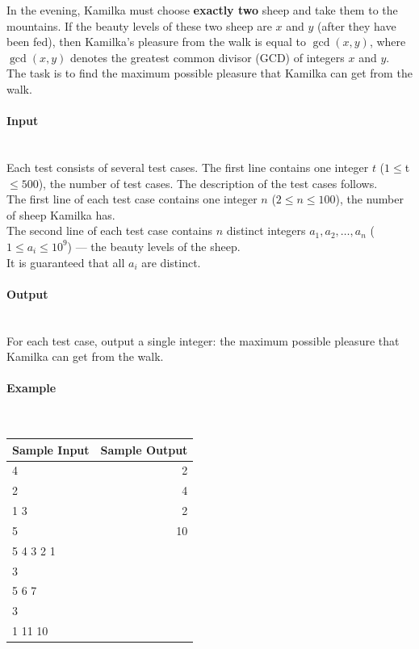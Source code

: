 \documentclass{article}
\begin{document}
In the evening, Kamilka must choose \textbf{exactly two} sheep and take them to the mountains. If the beauty levels of these two sheep are $x$ and $y$ (after they have been fed), then Kamilka's pleasure from the walk is equal to $\gcd(x, y)$, where $\gcd(x, y)$ denotes the greatest common divisor (GCD) of integers $x$ and $y$.
\\
The task is to find the maximum possible pleasure that Kamilka can get from the walk.

\paragraph{Input} \mbox{} \\

Each test consists of several test cases. The first line contains one integer $t$
 ($1 \leq $t$ \leq 500$), the number of test cases. The description of the test cases follows.
\\
The first line of each test case contains one integer $n$
 ($2 \leq n \leq 100$), the number of sheep Kamilka has.\\

The second line of each test case contains $n$
 distinct integers $a_1, a_2, …, a_n$ ($1 \leq a_i \leq 10^9$)
 — the beauty levels of the sheep.\\

It is guaranteed that all $a_i$ are distinct.
\paragraph{Output}\mbox{} \\

For each test case, output a single integer: the maximum possible pleasure that Kamilka can get from the walk.

\paragraph{Example}\mbox{} \\

\begin{table}[h]
    \centering
    \begin{tabular}{|l|r|}
        \hline
        \textbf{Sample Input} & \textbf{Sample Output} \\
        \hline
		4& 2 \\ 
		2& 4 \\ 
		1 3& 2 \\ 
		5& 10 \\ 
		5 4 3 2 1&  \\
		3&  \\ 
		5 6 7&  \\ 
		3&  \\ 
		1 11 10&  \\ 
		 \hline
    \end{tabular}
\end{table}
\end{document}
